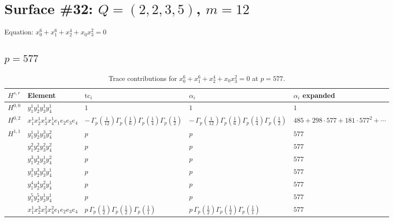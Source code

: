 \documentclass[11pt]{article}
\begin{document}
\newpage

\section*{Surface \#32: $Q=(2, 2, 3, 5)$, $m=12$}

Equation: $x_0^{6} + x_1^{6} + x_2^{4} + x_0 x_3^{2} = 0$

\subsection*{$p = 577$}

\begin{table}[ht]
\centering
\caption{Trace contributions for $x_0^{6} + x_1^{6} + x_2^{4} + x_0 x_3^{2} = 0$ at $p=577$.}\label{tab:deformed-32}
\renewcommand{\arraystretch}{1.1}
{\scriptsize
\begin{tabular}{@{}lllll@{}}
\toprule
$H^{s,r}$ & Element & $\mathrm{tc}_i$ & $\alpha_i$ & $\alpha_i$ expanded \\
\midrule
$H^{0,0}$ & $y_{1}^{1} y_{2}^{1} y_{3}^{1} y_{4}^{1}$ & $1$ & $1$ & $1$ \\
\midrule
$H^{0,2}$ & $x_{1}^{1} x_{2}^{1} x_{3}^{1} x_{4}^{1}  e_{1} e_{2} e_{3} e_{4}$ & $- \, \Gamma_p \left( \frac{1}{12} \right) \Gamma_p \left( \frac{1}{6} \right) \Gamma_p \left( \frac{1}{4} \right) \Gamma_p \left( \frac{1}{2} \right)$ & $- \, \Gamma_p \left( \frac{1}{12} \right) \Gamma_p \left( \frac{1}{6} \right) \Gamma_p \left( \frac{1}{4} \right) \Gamma_p \left( \frac{1}{2} \right)$ & $485{+}298{\cdot}577{+}181{\cdot}577^{2}{+}\cdots$ \\
\midrule
$H^{1,1}$ & $y_{1}^{1} y_{2}^{1} y_{3}^{3} y_{4}^{2}$ & $p \,$ & $p \,$ & $577$ \\
 & $y_{1}^{2} y_{2}^{2} y_{3}^{2} y_{4}^{2}$ & $p \,$ & $p \,$ & $577$ \\
 & $y_{1}^{3} y_{2}^{3} y_{3}^{1} y_{4}^{2}$ & $p \,$ & $p \,$ & $577$ \\
 & $y_{1}^{3} y_{2}^{3} y_{3}^{3} y_{4}^{1}$ & $p \,$ & $p \,$ & $577$ \\
 & $y_{1}^{4} y_{2}^{4} y_{3}^{2} y_{4}^{1}$ & $p \,$ & $p \,$ & $577$ \\
 & $y_{1}^{5} y_{2}^{5} y_{3}^{1} y_{4}^{1}$ & $p \,$ & $p \,$ & $577$ \\
 & $x_{1}^{1} x_{2}^{3} x_{3}^{2} x_{4}^{2}  e_{1} e_{2} e_{3} e_{4}$ & $p \, \Gamma_p \left( \frac{1}{2} \right) \Gamma_p \left( \frac{1}{2} \right) \Gamma_p \left( \frac{1}{1} \right)$ & $p \, \Gamma_p \left( \frac{1}{2} \right) \Gamma_p \left( \frac{1}{2} \right) \Gamma_p \left( \frac{1}{1} \right)$ & $577$ \\

\end{tabular}}
\end{table}
\end{document}
